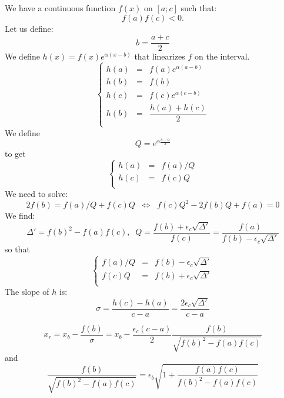 \documentclass[aps,12pt]{revtex4}
\begin{document}
We have a continuous function $f(x)$ on $[a;c]$ such that:
 $$f(a)f(c)<0.$$
Let us define:
$$
	b = \dfrac{a+c}{2}
$$
We define $h(x)=f(x)e^{\alpha(x-b)}$ that linearizes $f$ on the interval.
$$
\left\lbrace
\begin{array}{rcl}
	h(a) & = & f(a)e^{\alpha(a-b)}\\
	h(b) & = & f(b)\\
	h(c) & = & f(c) e^{\alpha(c-b)}\\
	h(b) & = & \dfrac{h(a)+h(c)}{2}\\
\end{array}
\right.
$$
We define
$$
Q = e^{\alpha\frac{c-a}{2}}
$$
to get
$$	
\left\lbrace
\begin{array}{rcl}
	h(a) & = & f(a)/Q\\
 	h(c) & = & f(c)Q\\
\end{array}
\right.
$$
We need to solve:
$$
	2f(b) = f(a)/Q+f(c)Q \;\; \Leftrightarrow \;\; f(c)Q^2 - 2 f(b) Q + f(a) = 0
$$
We find:
$$
	\Delta' = f(b)^2 - f(a)f(c), \;\; Q = \dfrac{f(b)+\epsilon_c \sqrt{\Delta'}}{f(c)} = \dfrac{f(a)}{f(b)-\epsilon_c \sqrt{\Delta'}}
$$
so that
$$
\left\lbrace
\begin{array}{rcl}
	f(a)/Q & = & f(b) - \epsilon_c \sqrt{\Delta'}\\
	f(c) Q & = & f(b) + \epsilon_c \sqrt{\Delta'}\\
\end{array}
\right.
$$
The slope of $h$ is:
\begin{equation}
	\sigma = \dfrac{h(c)-h(a)}{c-a} = \dfrac{2 \epsilon_c \sqrt{\Delta'}}{c-a}
\end{equation}
	
$$
	x_r = x_b - \dfrac{f(b)}{\sigma} = x_b - \dfrac{\epsilon_c \left(c-a\right)}{2} \dfrac{f(b)}{\sqrt{f(b)^2 - f(a)f(c)} }
$$
and
$$
	\dfrac{f(b)}{\sqrt{f(b)^2 - f(a)f(c)} } = \epsilon_b \sqrt{1+\dfrac{f(a)f(c)}{f(b)^2-f(a)f(c)}}
$$
\end{document}
